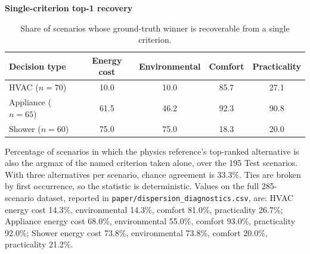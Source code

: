 \begin{table}[htbp]
\begin{threeparttable}
  \footnotesize
  \centering
  \textbf{Single-criterion top-1 recovery}
  \begin{tabular}{lcccc}
    \toprule
    Decision type & Energy cost & Environmental & Comfort & Practicality \\
    \midrule
    HVAC ($n=70$) & 10.0 & 10.0 & 85.7 & 27.1 \\
    Appliance ($n=65$) & 61.5 & 46.2 & 92.3 & 90.8 \\
    Shower ($n=60$) & 75.0 & 75.0 & 18.3 & 20.0 \\
    \bottomrule
  \end{tabular}
  \begin{tablenotes}
    \item Percentage of scenarios in which the physics reference's top-ranked alternative is also the argmax of the named criterion taken alone, over the 195 Test scenarios. With three alternatives per scenario, chance agreement is 33.3\%. Ties are broken by first occurrence, so the statistic is deterministic. Values on the full 285-scenario dataset, reported in \texttt{paper/dispersion\_diagnostics.csv}, are: HVAC energy cost 14.3\%, environmental 14.3\%, comfort 81.0\%, practicality 26.7\%; Appliance energy cost 68.0\%, environmental 55.0\%, comfort 93.0\%, practicality 92.0\%; Shower energy cost 73.8\%, environmental 73.8\%, comfort 20.0\%, practicality 21.2\%.
  \end{tablenotes}
\end{threeparttable}
\caption{Share of scenarios whose ground-truth winner is recoverable from a single criterion.}
\label{tab:single-criterion-recovery}
\end{table}
